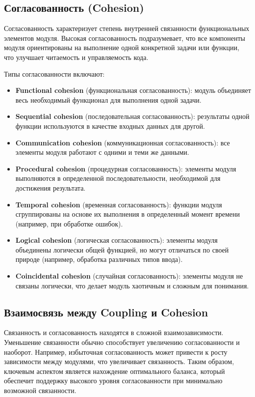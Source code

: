 \subsection*{Согласованность (Cohesion)}

Согласованность характеризует степень внутренней связанности функциональных элементов модуля\cite{meyer1997object}. Высокая согласованность подразумевает, что все компоненты модуля ориентированы на выполнение одной конкретной задачи или функции, что улучшает читаемость и управляемость кода.

Типы согласованности включают:

\begin{itemize}
    \item \textbf{Functional cohesion} (функциональная согласованность): модуль объединяет весь необходимый функционал для выполнения одной задачи.
    \item \textbf{Sequential cohesion} (последовательная согласованность): результаты одной функции используются в качестве входных данных для другой.
    \item \textbf{Communication cohesion} (коммуникационная согласованность): все элементы модуля работают с одними и теми же данными.
    \item \textbf{Procedural cohesion} (процедурная согласованность): элементы модуля выполняются в определенной последовательности, необходимой для достижения результата.
    \item \textbf{Temporal cohesion} (временная согласованность): функции модуля сгруппированы на основе их выполнения в определенный момент времени (например, при обработке ошибок).
    \item \textbf{Logical cohesion} (логическая согласованность): элементы модуля объединены логически общей функцией, но могут отличаться по своей природе (например, обработка различных типов ввода).
    \item \textbf{Coincidental cohesion} (случайная согласованность): элементы модуля не связаны логически, что делает модуль хаотичным и сложным для понимания.
\end{itemize}

\subsection*{Взаимосвязь между Coupling и Cohesion}

Связанность и согласованность находятся в сложной взаимозависимости\cite{bon2020adaptive}. Уменьшение связанности обычно способствует увеличению согласованности и наоборот. Например, избыточная согласованность может привести к росту зависимости между модулями, что увеличивает связанность. Таким образом, ключевым аспектом является нахождение оптимального баланса, который обеспечит поддержку высокого уровня согласованности при минимально возможной связанности.

